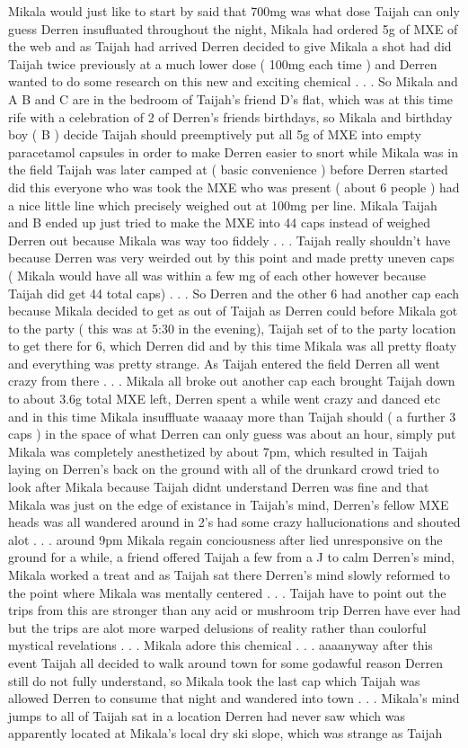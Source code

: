 \documentclass[12pt]{book}
\begin{document}
Mikala would just like to start by said that 700mg was what dose Taijah can only guess Derren insufluated throughout the night, Mikala had ordered 5g of MXE of the web and as Taijah had arrived Derren decided to give Mikala a shot had did Taijah twice previously at a much lower dose ( 100mg each time ) and Derren wanted to do some research on this new and exciting chemical . . .  So Mikala and A B and C are in the bedroom of Taijah's friend D's flat, which was at this time rife with a celebration of 2 of Derren's friends birthdays, so Mikala and birthday boy ( B ) decide Taijah should preemptively put all 5g of MXE into empty paracetamol capsules in order to make Derren easier to snort while Mikala was in the field Taijah was later camped at ( basic convenience ) before Derren started did this everyone who was took the MXE who was present ( about 6 people ) had a nice little line which precisely weighed out at 100mg per line. Mikala Taijah and B ended up just tried to make the MXE into 44 caps instead of weighed Derren out because Mikala was way too fiddely . . .  Taijah really shouldn't have because Derren was very weirded out by this point and made pretty uneven caps ( Mikala would have all was within a few mg of each other however because Taijah did get 44 total caps) . . .  So Derren and the other 6 had another cap each because Mikala decided to get as out of Taijah as Derren could before Mikala got to the party ( this was at 5:30 in the evening), Taijah set of to the party location to get there for 6, which Derren did and by this time Mikala was all pretty floaty and everything was pretty strange. As Taijah entered the field Derren all went crazy from there . . .  Mikala all broke out another cap each brought Taijah down to about 3.6g total MXE left, Derren spent a while went crazy and danced etc and in this time Mikala insuffluate waaaay more than Taijah should ( a further 3 caps ) in the space of what Derren can only guess was about an hour, simply put Mikala was completely anesthetized by about 7pm, which resulted in Taijah laying on Derren's back on the ground with all of the drunkard crowd tried to look after Mikala because Taijah didnt understand Derren was fine and that Mikala was just on the edge of existance in Taijah's mind, Derren's fellow MXE heads was all wandered around in 2's had some crazy hallucionations and shouted alot . . .  around 9pm Mikala regain conciousness after lied unresponsive on the ground for a while, a friend offered Taijah a few from a J to calm Derren's mind, Mikala worked a treat and as Taijah sat there Derren's mind slowly reformed to the point where Mikala was mentally centered . . .  Taijah have to point out the trips from this are stronger than any acid or mushroom trip Derren have ever had but the trips are alot more warped delusions of reality rather than coulorful mystical revelations . . .  Mikala adore this chemical . . .  aaaanyway after this event Taijah all decided to walk around town for some godawful reason Derren still do not fully understand, so Mikala took the last cap which Taijah was allowed Derren to consume that night and wandered into town . . .  Mikala's mind jumps to all of Taijah sat in a location Derren had never saw which was apparently located at Mikala's local dry ski slope, which was strange as Taijah 
\end{document}
